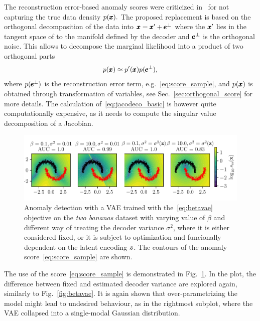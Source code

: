 The reconstruction error-based anomaly scores were criticized in~\cite{pidhorskyi2018generative} for not capturing the true data density $p(\pmb{{x}}).$ The proposed replacement is based on the orthogonal decomposition of the data into $\pmb{{x}}= \pmb{{x}}' + \pmb{{e}}^\bot$ where the $\pmb{{x}}'$ lies in the tangent space of to the manifold defined by the decoder and $\pmb{{e}}^\bot$ is the orthogonal noise. This allows to decompose the marginal likelihood into a product of two orthogonal parts
\begin{equation} \label{eq:jacodeco_basic}
    p(\pmb{{x}}) \approx p'(\pmb{{x}}) p(\pmb{{e}}^{\bot}),
\end{equation}
where $p(\pmb{{e}}^{\bot})$ is the reconstruction error term, e.g.~\eqref{eq:score_sample}, and $p(\pmb{{x}})$ is obtained through transformation of variables, see Sec.~\ref{sec:orthogonal_score} for more details. The calculation of~\eqref{eq:jacodeco_basic} is however quite computationally expensive, as it needs to compute the singular value decomposition of a Jacobian.

\begin{figure}
\begin{centering}
\includegraphics[scale=0.98]{data/chapter_survey/vae_examples.pdf}
\end{centering}
\caption{Anomaly detection with a VAE trained with the~\eqref{eq:betavae} objective on the \textit{two bananas} dataset with varying value of $\beta$ and different way of treating the decoder variance $\sigma^2$, where it is either considered fixed, or it is subject to optimization and funcionally dependent on the latent encoding $\pmb{{z}}$. The contours of the anomaly score~\eqref{eq:score_sample} are shown.}
\label{fig:vae_examples}
\end{figure}

The use of the score~\eqref{eq:score_sample} is demonstrated in Fig.~\ref{fig:vae_examples}. In the plot, the difference between fixed and estimated decoder variance are explored again, similarly to Fig.~\ref{fig:betavae}. It is again shown that over-parametrizing the model might lead to undesired behaviour, as in the rightmost subplot, where the VAE collapsed into a single-modal Gaussian distribution.

